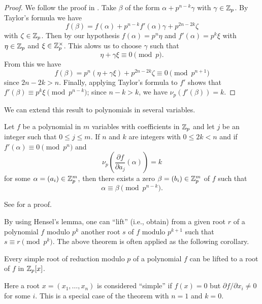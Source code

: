 \begin{proof}
    We follow the proof in \cite{serre2012course}. Take \(\beta\) of the form \(\alpha + p^{n-k}\gamma\) with \(\gamma \in \mathbb{Z}_p\). By Taylor's formula we have
    \[
        f(\beta) = f(\alpha) + p^{n-k}f'(\alpha)\gamma + p^{2n-2k}\zeta
    \]
    with \(\zeta \in \mathbb{Z}_p\). Then by our hypothesis \(f(\alpha) = p^n\eta\) and \(f'(\alpha) = p^k\xi\) with \(\eta \in \mathbb{Z}_p\) and \(\xi \in \mathbb{Z}_p^{\times}\). This alows us to choose \(\gamma\) such that
    \[
        \eta + \gamma\xi \equiv 0 \pmod{p}.
    \]
    From this we have
    \[
        f(\beta) = p^n(\eta + \gamma\xi) + p^{2n-2k}\zeta \equiv 0 \pmod{p^{n+1}}
    \]
    since \(2n - 2k > n\). Finally, applying Taylor's formula to \(f'\) shows that \(f'(\beta) \equiv p^k \xi \pmod{p^{n-k}}\); since \(n - k > k\), we have \(\nu_p(f'(\beta)) = k\).
\end{proof}

\medskip

We can extend this result to polynomials in several variables.

\begin{theorem}
    Let \(f\) be a polynomial in \(m\) variables with coefficients in \(\mathbb{Z}_p\) and let \(j\) be an integer such that \(0 \leq j \leq m\). If \(n\) and \(k\) are integers with \(0 \leq 2k < n\) and if \(f'(\alpha) \equiv 0 \pmod{p^n}\) and
    \[
        \nu_p\left(\frac{\partial f}{\partial a_j}(\alpha)\right) = k
    \]
    for some \(\alpha = (a_i) \in \mathbb{Z}_p^m\), then there exists a zero \(\beta = (b_i) \in \mathbb{Z}_p^m\) of \(f\) such that
    \[
        \alpha \equiv \beta \pmod{p^{n-k}}.
    \]
\end{theorem}

See \cite[pp.~14--15]{serre2012course} for a proof.

\medskip

By using Hensel's lemma, one can ``lift'' (i.e., obtain) from a given root \(r\) of a polynomial \(f\) modulo \(p^k\) another root \(s\) of \(f\) modulo \(p^{k+1}\) such that \(s \equiv r \pmod{p^k}\). The above theorem is often applied as the following corollary.

\begin{corollary}
    Every simple root of reduction modulo \(p\) of a polynomial \(f\) can be lifted to a root of \(f\) in \(\mathbb{Z}_p[x]\).
\end{corollary}

Here a root \(x = (x_1, \dots, x_n)\) is considered ``simple'' if \(f(x) = 0\) but \(\partial f / \partial x_i \neq 0\) for some \(i\). This is a special case of the theorem with \(n = 1\) and \(k = 0\).


